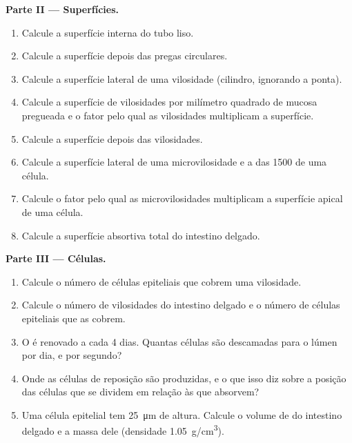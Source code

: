 \begin{problem}
\medskip
\noindent\textbf{Parte II --- Superfícies.}
\begin{enumerate}[resume]
  \item Calcule a superfície interna do tubo liso.
  \item Calcule a superfície depois das pregas circulares.
  \item Calcule a superfície lateral de uma vilosidade (cilindro,
        ignorando a ponta).
  \item Calcule a superfície de vilosidades por milímetro quadrado de
        mucosa pregueada e o fator pelo qual as vilosidades multiplicam
        a superfície.
  \item Calcule a superfície depois das vilosidades.
  \item Calcule a superfície lateral de uma microvilosidade e a das
        \qty{1500}{} de uma célula.
  \item Calcule o fator pelo qual as microvilosidades multiplicam a
        superfície apical de uma célula.
  \item Calcule a superfície absortiva total do intestino delgado.
\end{enumerate}

\medskip
\noindent\textbf{Parte III --- Células.}
\begin{enumerate}[resume]
  \item Calcule o número de células epiteliais que cobrem uma
        vilosidade.
  \item Calcule o número de vilosidades do intestino delgado e o número
        de células epiteliais que as cobrem.
  \item O  é renovado a cada \qty{4}{} dias. Quantas células são
        descamadas para o lúmen por dia, e por segundo?
  \item Onde as células de reposição são produzidas, e o que isso diz
        sobre a posição das células que se dividem em relação às que
        absorvem?
  \item Uma célula epitelial tem \qty{25}{\micro m} de altura. Calcule o
        volume de  do intestino delgado e a massa dele
        (densidade \qty{1.05}{g/cm^3}).
\end{enumerate}


\end{problem}
